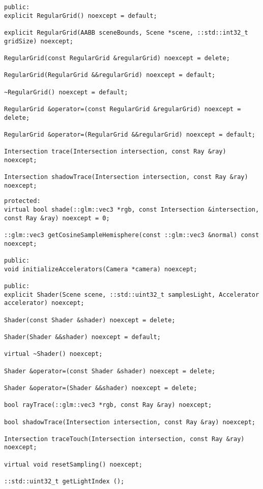 \begin{lstlisting}[caption={RegularGrid API}, captionpos=b, label=API_RegularGrid]
public:
explicit RegularGrid() noexcept = default;

explicit RegularGrid(AABB sceneBounds, Scene *scene, ::std::int32_t gridSize) noexcept;

RegularGrid(const RegularGrid &regularGrid) noexcept = delete;

RegularGrid(RegularGrid &&regularGrid) noexcept = default;

~RegularGrid() noexcept = default;

RegularGrid &operator=(const RegularGrid &regularGrid) noexcept = delete;

RegularGrid &operator=(RegularGrid &&regularGrid) noexcept = default;

Intersection trace(Intersection intersection, const Ray &ray) noexcept;

Intersection shadowTrace(Intersection intersection, const Ray &ray) noexcept;
\end{lstlisting}


\begin{lstlisting}[caption={Shader API}, captionpos=b, label=API_Shader]
protected:
virtual bool shade(::glm::vec3 *rgb, const Intersection &intersection,
const Ray &ray) noexcept = 0;

::glm::vec3 getCosineSampleHemisphere(const ::glm::vec3 &normal) const noexcept;

public:
void initializeAccelerators(Camera *camera) noexcept;

public:
explicit Shader(Scene scene, ::std::uint32_t samplesLight, Accelerator accelerator) noexcept;

Shader(const Shader &shader) noexcept = delete;

Shader(Shader &&shader) noexcept = default;

virtual ~Shader() noexcept;

Shader &operator=(const Shader &shader) noexcept = delete;

Shader &operator=(Shader &&shader) noexcept = delete;

bool rayTrace(::glm::vec3 *rgb, const Ray &ray) noexcept;

bool shadowTrace(Intersection intersection, const Ray &ray) noexcept;

Intersection traceTouch(Intersection intersection, const Ray &ray) noexcept;

virtual void resetSampling() noexcept;

::std::uint32_t getLightIndex ();
\end{lstlisting}

